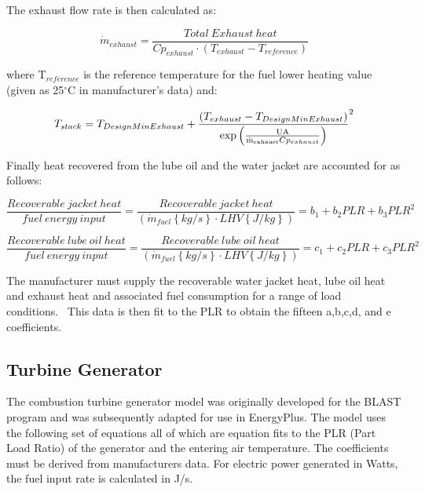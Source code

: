 The exhaust flow rate is then calculated as:

\begin{equation}
{\dot m_{exhaust}} = \frac{{Total~Exhaust~heat}}{{C{p_{exhaust}} \cdot \left( {{T_{exhaust}} - {T_{reference}}} \right)}}
\end{equation}

where T\(_{reference}\) is the reference temperature for the fuel lower heating value (given as 25\(^{\circ}\)C in manufacturer's data) and:

\begin{equation}
{T_{stack}} = {T_{DesignMinExhaust}} + {\frac{{\left( {{T_{exhaust}} - {T_{DesignMinExhaust}}} \right)}}{{{\rm{exp}}\left( {\frac{{{\rm{UA}}}}{{{{{\rm{\dot m}}}_{{\rm{exhaust}}}}C{p_{exhaust}}}}} \right)}}^2}
\end{equation}

Finally heat recovered from the lube oil and the water jacket are accounted for as follows:

\begin{equation}
\frac{{Recoverable~jacket~heat}}{{fuel~energy~input}} = \frac{{Recoverable~jacket~heat}}{{\left( {{{\dot m}_{fuel}}\left\{ {kg/s} \right\} \cdot LHV\left\{ {J/kg} \right\}} \right)}} = {b_1} + {b_2}PLR + {b_3}PL{R^2}
\end{equation}

\begin{equation}
\frac{{Recoverable~lube~oil~heat}}{{fuel~energy~input}} = \frac{{Recoverable~lube~oil~heat}}{{\left( {{{\dot m}_{fuel}}\left\{ {kg/s} \right\} \cdot LHV\left\{ {J/kg} \right\}} \right)}} = {c_1} + {c_2}PLR + {c_3}PL{R^2}
\end{equation}

The manufacturer must supply the recoverable water jacket heat, lube oil heat and exhaust heat and associated fuel consumption for a range of load conditions.~ This data is then fit to the PLR to obtain the fifteen a,b,c,d, and e coefficients.

\subsection{Turbine Generator}\label{turbine-generator}

The combustion turbine generator model was originally developed for the BLAST program and was subsequently adapted for use in EnergyPlus. The model uses the following set of equations all of which are equation fits to the PLR (Part Load Ratio) of the generator and the entering air temperature. The coefficients must be derived from manufacturers data. For electric power generated in Watts, the fuel input rate is calculated in J/s.


